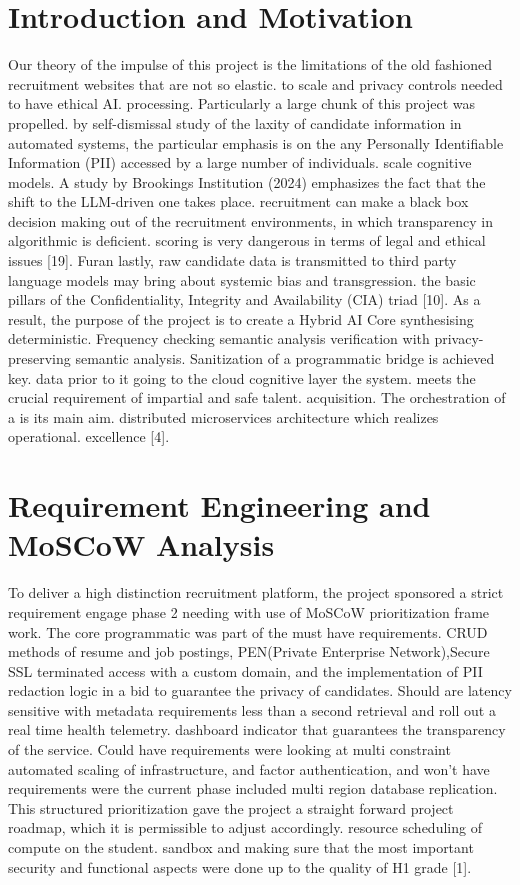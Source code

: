 \documentclass[conference]{IEEEtran}
\begin{document}
\section{Introduction and Motivation}
Our theory of the impulse of this project is the limitations of the old fashioned recruitment websites that are not so elastic. to scale and privacy controls needed to have ethical AI. processing. Particularly a large chunk of this project was propelled. by self-dismissal study of the laxity of candidate information in automated systems, the particular emphasis is on the any Personally Identifiable Information (PII) accessed by a large number of individuals. scale cognitive models. A study by Brookings Institution (2024) emphasizes the fact that the shift to the LLM-driven one takes place. recruitment can make a black box decision making out of the recruitment environments, in which transparency in algorithmic is deficient. scoring is very dangerous in terms of legal and ethical issues [19]. Furan lastly, raw candidate data is transmitted to third party language models may bring about systemic bias and transgression. the basic pillars of the Confidentiality, Integrity and Availability (CIA) triad [10]. As a result, the purpose of the project is to create a Hybrid AI Core synthesising deterministic. Frequency checking semantic analysis verification with privacy-preserving semantic analysis. Sanitization of a programmatic bridge is achieved key. data prior to it going to the cloud cognitive layer the system. meets the crucial requirement of impartial and safe talent. acquisition. The orchestration of a is its main aim. distributed microservices architecture which realizes operational. excellence [4].

\section{Requirement Engineering and MoSCoW Analysis}
To deliver a high distinction recruitment platform, the project sponsored a strict requirement engage phase 2 needing with use of MoSCoW prioritization frame work. The core programmatic was part of the must have requirements. CRUD methods of resume and job postings, PEN(Private Enterprise Network),Secure SSL terminated access with a custom domain, and the implementation of PII redaction logic in a bid to guarantee the privacy of candidates. Should are latency sensitive with metadata requirements less than a second retrieval and roll out a real time health telemetry. dashboard indicator that guarantees the transparency of the service. Could have requirements were looking at multi constraint automated scaling of infrastructure, and factor authentication, and won’t have requirements were the current phase included multi region database replication. This structured prioritization gave the project a straight forward project roadmap, which it is permissible to adjust accordingly. resource scheduling of compute on the student. sandbox and making sure that the most important security and functional aspects were done up to the quality of H1 grade [1]. 
\end{document}
